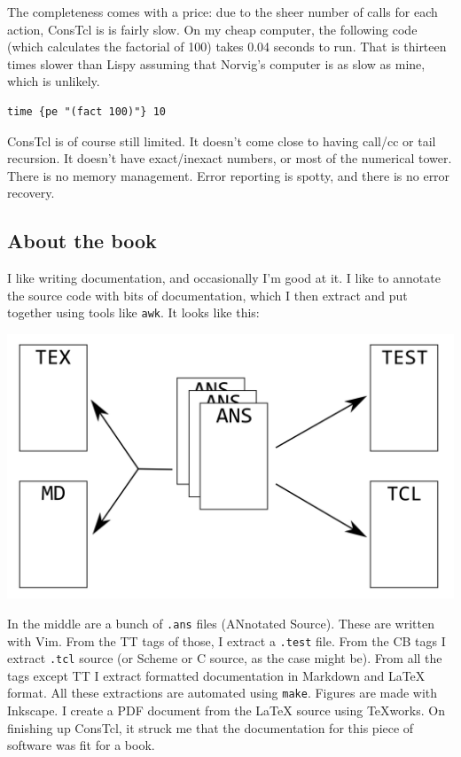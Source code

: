 \documentclass[a5paper,final]{memoir}
\begin{document}
The completeness comes with a price: due to the sheer number of calls for each
action, ConsTcl is is fairly slow. On my cheap computer, the following code
(which calculates the factorial of 100) takes 0.04 seconds to run. That is thirteen
times slower than Lispy assuming that Norvig's computer is as slow as mine,
which is unlikely.

\begin{verbatim}
time {pe "(fact 100)"} 10
\end{verbatim}

ConsTcl is of course still limited. It doesn't come close to having call/cc or
tail recursion. It doesn't have exact/inexact numbers, or most of the numerical
tower. There is no memory management. Error reporting is spotty, and there is no
error recovery.

\subsection{About the book}
\label{about-the-book}


I like writing documentation, and occasionally I'm good at it. I like to
annotate the source code with bits of documentation, which I then extract and
put together using tools like \texttt{awk}. It looks like this:

\includegraphics{images/document.png}

In the middle are a bunch of \texttt{.ans} files (ANnotated Source). These are
written with Vim. From the TT tags of those, I extract a \texttt{.test} file.
From the CB tags I extract \texttt{.tcl} source (or Scheme or C source, as the
case might be). From all the tags except TT I extract formatted documentation
in Markdown and \LaTeX{} format. All these extractions are automated using
\texttt{make}.  Figures are made with Inkscape.  I create a PDF document from
the \LaTeX{} source using TeXworks. On finishing up ConsTcl, it struck me that
the documentation for this piece of software was fit for a book.
\end{document}
